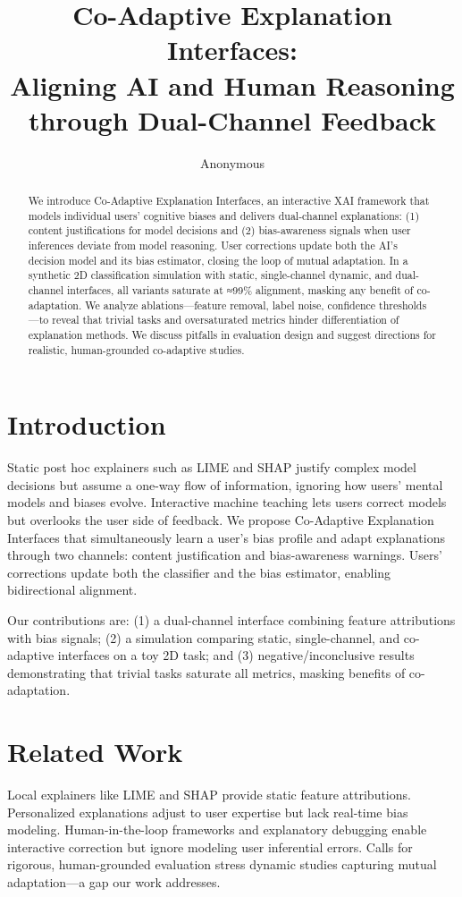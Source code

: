 \documentclass{article} %
\title{Co-Adaptive Explanation Interfaces:\\Aligning AI and Human Reasoning through Dual-Channel Feedback}
\author{Anonymous}
\begin{document}
\maketitle

\begin{abstract}
We introduce Co-Adaptive Explanation Interfaces, an interactive XAI framework that models individual users' cognitive biases and delivers dual-channel explanations: (1) content justifications for model decisions and (2) bias-awareness signals when user inferences deviate from model reasoning. User corrections update both the AI's decision model and its bias estimator, closing the loop of mutual adaptation. In a synthetic 2D classification simulation with static, single-channel dynamic, and dual-channel interfaces, all variants saturate at ≈99\% alignment, masking any benefit of co-adaptation. We analyze ablations—feature removal, label noise, confidence thresholds—to reveal that trivial tasks and oversaturated metrics hinder differentiation of explanation methods. We discuss pitfalls in evaluation design and suggest directions for realistic, human-grounded co-adaptive studies.
\end{abstract}

\section{Introduction}
Static post hoc explainers such as LIME \citep{ribeiro2016whysi} and SHAP \citep{lundberg2017aua} justify complex model decisions but assume a one-way flow of information, ignoring how users' mental models and biases evolve. Interactive machine teaching \citep{amershi2014powertt,kulesza2015principlesoe} lets users correct models but overlooks the user side of feedback. We propose Co-Adaptive Explanation Interfaces that simultaneously learn a user's bias profile \citep{tversky1974judgmentuu} and adapt explanations through two channels: content justification and bias-awareness warnings. Users' corrections update both the classifier and the bias estimator, enabling bidirectional alignment.

Our contributions are: (1) a dual-channel interface combining feature attributions with bias signals; (2) a simulation comparing static, single-channel, and co-adaptive interfaces on a toy 2D task; and (3) negative/inconclusive results demonstrating that trivial tasks saturate all metrics, masking benefits of co-adaptation.

\section{Related Work}
Local explainers like LIME \citep{ribeiro2016whysi} and SHAP \citep{lundberg2017aua} provide static feature attributions. Personalized explanations \citep{poursabzi-sangdeh2018manipulatingam} adjust to user expertise but lack real-time bias modeling. Human-in-the-loop frameworks \citep{amershi2014powertt} and explanatory debugging \citep{kulesza2015principlesoe} enable interactive correction but ignore modeling user inferential errors. Calls for rigorous, human-grounded evaluation \citep{doshi-velez2017towardsar,miller2017explanationia} stress dynamic studies capturing mutual adaptation—a gap our work addresses.
\end{document}
